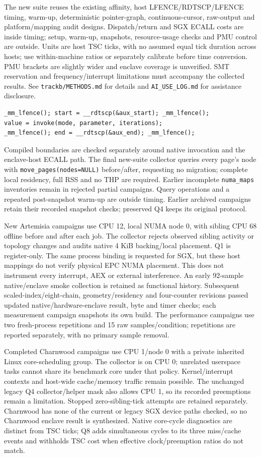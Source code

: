 \documentclass[11pt]{article}
\begin{document}
The new suite reuses the existing affinity, host LFENCE/RDTSCP/LFENCE timing, warm-up, deterministic pointer-graph, continuous-cursor, raw-output and platform/mapping audit designs. Dispatch/return and SGX ECALL costs are inside timing; setup, warm-up, snapshots, resource-usage checks and PMU control are outside. Units are host TSC ticks, with no assumed equal tick duration across hosts; use within-machine ratios or separately calibrate before time conversion. PMU brackets are slightly wider and enclave coverage is unverified. SMT reservation and frequency/interrupt limitations must accompany the collected results. See \texttt{trackb/METHODS.md} for details and \texttt{AI\_USE\_LOG.md} for assistance disclosure.
\begin{verbatim}
_mm_lfence(); start = __rdtscp(&aux_start); _mm_lfence();
value = invoke(mode, parameter, iterations);
_mm_lfence(); end = __rdtscp(&aux_end); _mm_lfence();
\end{verbatim}
Compiled boundaries are checked separately around native invocation and the enclave-host ECALL path. The final new-suite collector queries every page's node with \texttt{move\_pages(nodes=NULL)} before/after, requesting no migration; complete local residency, full RSS and no THP are required. Earlier incomplete \texttt{numa\_maps} inventories remain in rejected partial campaigns. Query operations and a repeated post-snapshot warm-up are outside timing. Earlier archived campaigns retain their recorded snapshot checks; preserved Q4 keeps its original protocol.

New Artemisia campaigns use CPU 12, local NUMA node 0, with sibling CPU 68 offline before and after each job. The collector rejects observed sibling activity or topology changes and audits native 4 KiB backing/local placement. Q1 is register-only. The same process binding is requested for SGX, but these host mappings do not verify physical EPC NUMA placement. This does not instrument every interrupt, AEX or external interference. An early 92-sample native/enclave smoke collection is retained as functional history. Subsequent scaled-index/eight-chain, geometry/residency and four-counter revisions passed updated native/hardware-enclave result, byte and timer checks; each measurement campaign snapshots its own build. The performance campaigns use two fresh-process repetitions and 15 raw samples/condition; repetitions are reported separately, with no primary sample removal.

Completed Charnwood campaigns use CPU 1/node 0 with a private inherited Linux core-scheduling group. The collector is on CPU 0; unrelated userspace tasks cannot share its benchmark core under that policy. Kernel/interrupt contexts and host-wide cache/memory traffic remain possible. The unchanged legacy Q4 collector/helper mask also allows CPU 1, so its recorded preemptions remain a limitation. Stopped zero-sibling-tick attempts are retained separately. Charnwood has none of the current or legacy SGX device paths checked, so no Charnwood enclave result is synthesized. Native core-cycle diagnostics are distinct from TSC ticks; Q8 adds simultaneous cycles to its three miss/cache events and withholds TSC cost when effective clock/preemption ratios do not match.
\end{document}
